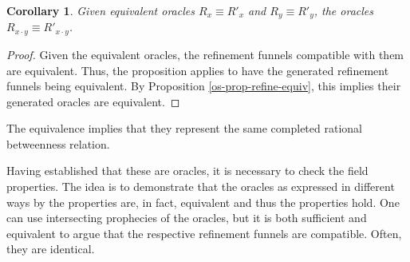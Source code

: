 \documentclass[12pt]{article}
\newtheorem{corollary}{Corollary}[section]
\begin{document}
\begin{corollary}
    Given equivalent oracles $R_x \equiv R'_x$ and $R_y \equiv R'_y$, the oracles $R_{x \cdot y} \equiv R'_{x \cdot y}$.
\end{corollary}

\begin{proof}
    Given the equivalent oracles, the refinement funnels compatible with them are equivalent. Thus, the proposition applies to have the generated refinement funnels being equivalent. By Proposition \ref{os-prop-refine-equiv}, this implies their generated oracles are equivalent. 
\end{proof}

The equivalence implies that they represent the same completed rational betweenness relation.

Having established that these are oracles, it is necessary to check the field properties. The idea is to demonstrate that the oracles as expressed in different ways by the properties are, in fact, equivalent and thus the properties hold. One can use intersecting prophecies of the oracles, but it is both sufficient and equivalent to argue that the respective refinement funnels are compatible. Often, they are identical. 
\end{document}
